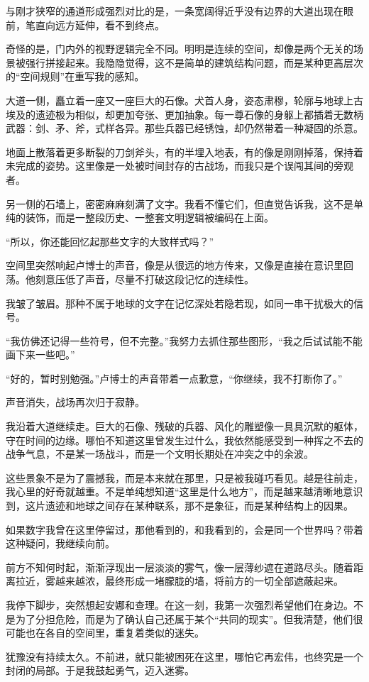 与刚才狭窄的通道形成强烈对比的是，一条宽阔得近乎没有边界的大道出现在眼前，笔直向远方延伸，看不到终点。

奇怪的是，门内外的视野逻辑完全不同。明明是连续的空间，却像是两个无关的场景被强行拼接起来。我隐隐觉得，这不是简单的建筑结构问题，而是某种更高层次的“空间规则”在重写我的感知。

大道一侧，矗立着一座又一座巨大的石像。犬首人身，姿态肃穆，轮廓与地球上古埃及的遗迹极为相似，却更加夸张、更加抽象。每一尊石像的身躯上都插着无数柄武器：剑、矛、斧，式样各异。那些兵器已经锈蚀，却仍然带着一种凝固的杀意。

地面上散落着更多断裂的刀剑斧头，有的半埋入地表，有的像是刚刚掉落，保持着未完成的姿势。这里像是一处被时间封存的古战场，而我只是个误闯其间的旁观者。

另一侧的石墙上，密密麻麻刻满了文字。我看不懂它们，但直觉告诉我，这不是单纯的装饰，而是一整段历史、一整套文明逻辑被编码在上面。

\SceneBreak

“所以，你还能回忆起那些文字的大致样式吗？”

\SceneBreak

空间里突然响起卢博士的声音，像是从很远的地方传来，又像是直接在意识里回荡。他刻意压低了声音，尽量不打破这段记忆的连续性。

我皱了皱眉。那种不属于地球的文字在记忆深处若隐若现，如同一串干扰极大的信号。

“我仿佛还记得一些符号，但不完整。”我努力去抓住那些图形，“我之后试试能不能画下来一些吧。”

“好的，暂时别勉强。”卢博士的声音带着一点歉意，“你继续，我不打断你了。”

声音消失，战场再次归于寂静。

我沿着大道继续走。巨大的石像、残破的兵器、风化的雕塑像一具具沉默的躯体，守在时间的边缘。哪怕不知道这里曾发生过什么，我依然能感受到一种挥之不去的战争气息，不是某一场战斗，而是一个文明长期处在冲突之中的余波。

这些景象不是为了震撼我，而是本来就在那里，只是被我碰巧看见。越是往前走，我心里的好奇就越重。不是单纯想知道“这里是什么地方”，而是越来越清晰地意识到，这片遗迹和地球之间存在某种联系，那不是象征，而是某种结构上的因果。

如果数字我曾在这里停留过，那他看到的，和我看到的，会是同一个世界吗？带着这种疑问，我继续向前。

前方不知何时起，渐渐浮现出一层淡淡的雾气，像一层薄纱遮在道路尽头。随着距离拉近，雾越来越浓，最终形成一堵朦胧的墙，将前方的一切全部遮蔽起来。

我停下脚步，突然想起安娜和查理。在这一刻，我第一次强烈希望他们在身边。不是为了分担危险，而是为了确认自己还属于某个“共同的现实”。但我清楚，他们很可能也在各自的空间里，重复着类似的迷失。

犹豫没有持续太久。不前进，就只能被困死在这里，哪怕它再宏伟，也终究是一个封闭的局部。于是我鼓起勇气，迈入迷雾。
